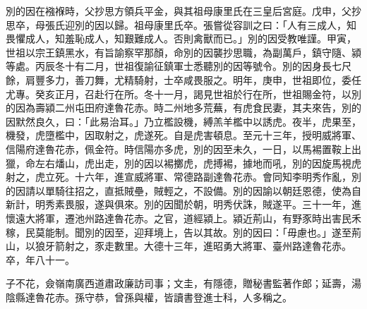 \begin{pinyinscope}
 別的因在襁褓時，父抄思方領兵平金，與其祖母康里氏在三皇后宮庭。戊申，父抄思卒，母張氏迎別的因以歸。祖母康里氏卒。張嘗從容訓之曰：「人有三成人，知畏懼成人，知羞恥成人，知艱難成人。否則禽獸而已。」別的因受教唯謹。甲寅，世祖以宗王鎮黑水，有旨諭察罕那顏，命別的因襲抄思職，為副萬戶，鎮守隨、潁等處。丙辰冬十有二月，世祖復諭征鎮軍士悉聽別的因等號令。別的因身長七尺餘，肩豐多力，善刀舞，尤精騎射，士卒咸畏服之。明年，庚申，世祖即位，委任尤專。癸亥正月，召赴行在所。冬十一月，謁見世祖於行在所，世祖賜金符，以別的因為壽潁二州屯田府達魯花赤。時二州地多荒蕪，有虎食民妻，其夫來告，別的因默然良久，曰：「此易治耳。」乃立檻設機，縛羔羊檻中以誘虎。夜半，虎果至，機發，虎墮檻中，因取射之，虎遂死。自是虎害頓息。至元十三年，授明威將軍、信陽府達魯花赤，佩金符。時信陽亦多虎，別的因至未久，一日，以馬裼置鞍上出獵，命左右燔山，虎出走，別的因以裼擲虎，虎搏裼，據地而吼，別的因旋馬視虎射之，虎立死。十六年，進宣威將軍、常德路副達魯花赤。會同知李明秀作亂，別的因請以單騎往招之，直抵賊壘，賊輕之，不設備。別的因諭以朝廷恩德，使為自新計，明秀素畏服，遂與俱來。別的因聞於朝，明秀伏誅，賊遂平。三十一年，進懷遠大將軍，遷池州路達魯花赤。之官，道經潁上。潁近荊山，有野豕時出害民禾稼，民莫能制。聞別的因至，迎拜境上，告以其故。別的因曰：「毋慮也。」遂至荊山，以狼牙箭射之，豕走數里。大德十三年，進昭勇大將軍、臺州路達魯花赤。卒，年八十一。



 子不花，僉嶺南廣西道肅政廉訪司事；文圭，有隱德，贈秘書監著作郎；延壽，湯陰縣達魯花赤。孫守恭，曾孫與權，皆讀書登進士科，人多稱之。



\end{pinyinscope}